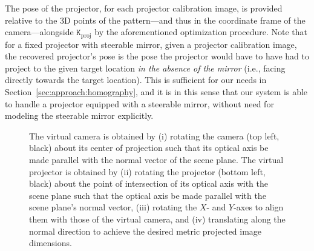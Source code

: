 \documentclass[review]{elsarticle}
\begin{document}
The pose of the projector, for each projector calibration image, is provided relative to the 3D points of the pattern---and thus in the coordinate frame of the camera---alongside $\mathtt{K}_\text{proj}$ by the aforementioned optimization procedure. Note that for a fixed projector with steerable mirror, given a projector calibration image, the recovered projector's pose is the pose the projector would have to have had to project to the given target location \textit{in the absence of the mirror} (i.e., facing directly towards the target location). This is sufficient for our needs in Section~\ref{sec:approach:homography}, and it is in this sense that our system is able to handle a projector equipped with a steerable mirror, without need for modeling the steerable mirror explicitly.

\begin{figure}
    \centering
    \qquad
    \caption{The virtual camera is obtained by (i) rotating the camera (top left, black) about its center of projection such that its optical axis be made parallel with the normal vector of the scene plane. The virtual projector is obtained by (ii) rotating the projector (bottom left, black) about the point of intersection of its optical axis with the scene plane such that the optical axis be made parallel with the scene plane's normal vector, (iii) rotating the $X$- and $Y$-axes to align them with those of the virtual camera, and (iv) translating along the normal direction to achieve the desired metric projected image dimensions.} %
    \label{fig:virtualproj}
\end{figure}
\end{document}
